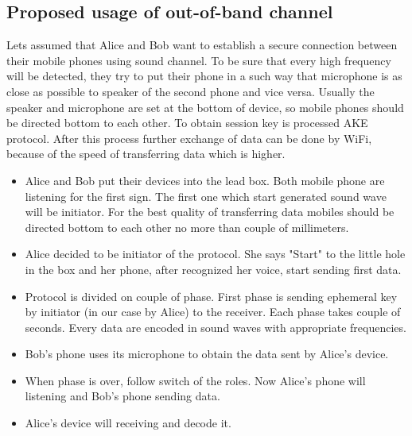 \documentclass[11pt,titlepage]{article}
\theoremstyle{plain}
\begin{document}

\subsection{Proposed usage of out-of-band channel}

Lets assumed that Alice and Bob want to establish a secure connection between their mobile phones using sound channel. To be sure that every high frequency will be detected, they try to put their phone in a such way that microphone is as close as possible to speaker of the second phone and vice versa. Usually the speaker and microphone are set at the bottom of device, so mobile phones should be directed bottom to each other. To obtain session key is processed AKE protocol. After this process further exchange of data can be done by WiFi, because of the speed of transferring data which is higher. 

\vspace{5mm}

\begin{itemize}
	\item Alice and Bob put their devices into the lead box. Both mobile phone are listening for the first sign. The first one which start generated sound wave will be initiator. For the best quality of transferring data mobiles should be directed bottom to each other no more than couple of millimeters.
	\item Alice decided to be initiator of the protocol. She says "Start" to the little hole in the box and her phone, after recognized her voice, start sending first data.
	\item Protocol is divided on couple of phase. First phase is sending ephemeral key by initiator (in our case by Alice) to the receiver. Each phase takes couple of seconds. Every data are encoded in sound waves with appropriate frequencies.
	\item Bob's phone uses its microphone to obtain the data sent by Alice's device.
	\item When phase is over, follow switch of the roles. Now Alice's phone will listening and Bob's phone sending data.
	\item Alice's device will receiving and decode it.
\end{itemize}
\end{document}
